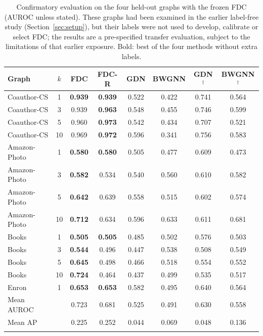 \documentclass[pdflatex,sn-mathphys-ay]{sn-jnl}
\theoremstyle{plain}
\theoremstyle{remark}
\begin{document}
\begin{table}[!ht]
\caption{Confirmatory evaluation on the four held-out graphs with the frozen FDC (AUROC unless stated). These graphs had been examined in the earlier label-free study (Section~\ref{sec:setup}), but their labels were not used to develop, calibrate or select FDC; the results are a pre-specified transfer evaluation, subject to the limitations of that earlier exposure. Bold: best of the four methods without extra labels.}
\label{tab:heldout}
\footnotesize
\begin{tabular*}{\textwidth}{@{\extracolsep{\fill}}lccccccc@{}}
\toprule
Graph & $k$ & FDC & FDC-R & GDN & BWGNN & GDN$^{\dagger}$ & BWGNN$^{\dagger}$ \\
\midrule
Coauthor-CS & 1 & \textbf{0.939} & \textbf{0.939} & 0.522 & 0.422 & 0.741 & 0.564 \\
Coauthor-CS & 3 & 0.939 & \textbf{0.963} & 0.548 & 0.455 & 0.746 & 0.599 \\
Coauthor-CS & 5 & 0.960 & \textbf{0.973} & 0.542 & 0.434 & 0.707 & 0.521 \\
Coauthor-CS & 10 & 0.969 & \textbf{0.972} & 0.596 & 0.341 & 0.756 & 0.583 \\
Amazon-Photo & 1 & \textbf{0.580} & \textbf{0.580} & 0.505 & 0.477 & 0.609 & 0.473 \\
Amazon-Photo & 3 & \textbf{0.582} & 0.534 & 0.540 & 0.560 & 0.610 & 0.582 \\
Amazon-Photo & 5 & \textbf{0.642} & 0.639 & 0.558 & 0.515 & 0.602 & 0.574 \\
Amazon-Photo & 10 & \textbf{0.712} & 0.634 & 0.596 & 0.633 & 0.611 & 0.681 \\
Books & 1 & \textbf{0.505} & \textbf{0.505} & 0.485 & 0.502 & 0.576 & 0.503 \\
Books & 3 & \textbf{0.544} & 0.496 & 0.447 & 0.538 & 0.508 & 0.549 \\
Books & 5 & \textbf{0.645} & 0.498 & 0.466 & 0.518 & 0.554 & 0.552 \\
Books & 10 & \textbf{0.724} & 0.464 & 0.437 & 0.499 & 0.535 & 0.517 \\
Enron & 1 & \textbf{0.653} & \textbf{0.653} & 0.582 & 0.495 & 0.640 & 0.564 \\
\midrule
Mean AUROC & & 0.723 & 0.681 & 0.525 & 0.491 & 0.630 & 0.558 \\
Mean AP & & 0.225 & 0.252 & 0.044 & 0.069 & 0.048 & 0.136 \\
\botrule
\end{tabular*}
\end{table}
\end{document}
